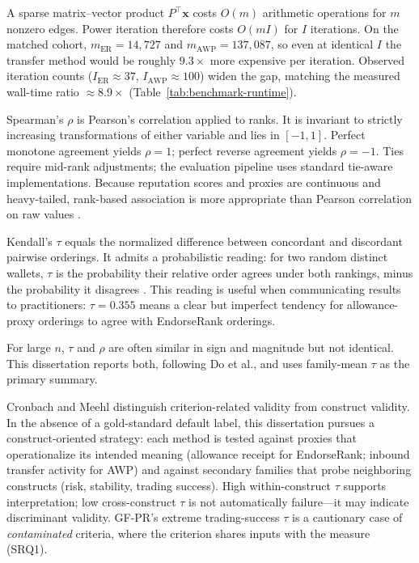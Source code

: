 A sparse matrix--vector product $P^{\top}\mathbf{x}$ costs $O(m)$ arithmetic operations for $m$ nonzero edges. Power iteration therefore costs $O(mI)$ for $I$ iterations. On the matched cohort, $m_{\mathrm{ER}}=14{,}727$ and $m_{\mathrm{AWP}}=137{,}087$, so even at identical $I$ the transfer method would be roughly $9.3\times$ more expensive per iteration. Observed iteration counts ($I_{\mathrm{ER}}\approx 37$, $I_{\mathrm{AWP}}\approx 100$) widen the gap, matching the measured wall-time ratio $\approx 8.9\times$ (Table~\ref{tab:benchmark-runtime}).


Spearman's $\rho$ is Pearson's correlation applied to ranks. It is invariant to strictly increasing transformations of either variable and lies in $[-1,1]$. Perfect monotone agreement yields $\rho=1$; perfect reverse agreement yields $\rho=-1$. Ties require mid-rank adjustments; the evaluation pipeline uses standard tie-aware implementations. Because reputation scores and proxies are continuous and heavy-tailed, rank-based association is more appropriate than Pearson correlation on raw values .


Kendall's $\tau$ equals the normalized difference between concordant and discordant pairwise orderings. It admits a probabilistic reading: for two random distinct wallets, $\tau$ is the probability their relative order agrees under both rankings, minus the probability it disagrees . This reading is useful when communicating results to practitioners: $\tau=0.355$ means a clear but imperfect tendency for allowance-proxy orderings to agree with EndorseRank orderings.

For large $n$, $\tau$ and $\rho$ are often similar in sign and magnitude but not identical. This dissertation reports both, following Do et al., and uses family-mean $\tau$ as the primary summary.


Cronbach and Meehl distinguish criterion-related validity from construct validity. In the absence of a gold-standard default label, this dissertation pursues a construct-oriented strategy: each method is tested against proxies that operationalize its intended meaning (allowance receipt for EndorseRank; inbound transfer activity for AWP) and against secondary families that probe neighboring constructs (risk, stability, trading success). High within-construct $\tau$ supports interpretation; low cross-construct $\tau$ is not automatically failure---it may indicate discriminant validity. GF-PR's extreme trading-success $\tau$ is a cautionary case of \emph{contaminated} criteria, where the criterion shares inputs with the measure (SRQ1).

